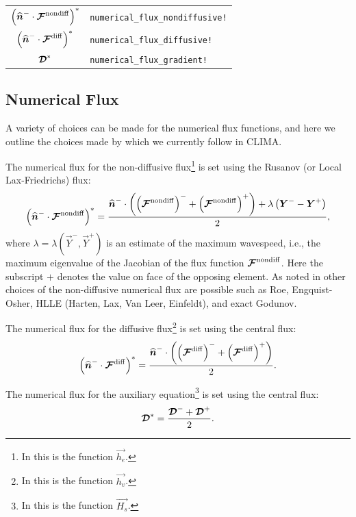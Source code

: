 \documentclass{report}
\begin{document}
{\begin{table}[h]
  \centering
  \begin{tabular}{cl}
    ${\left(\widehat{\boldsymbol{{n}}}^{-} \cdot \boldsymbol{{\mathcal{F}}}^{\mathrm{nondiff}}\right)}^{*}$ & \texttt{numerical\_flux\_nondiffusive!}\\
    ${\left(\widehat{\boldsymbol{{n}}}^{-} \cdot \boldsymbol{{\mathcal{F}}}^{\mathrm{diff}}\right)}^{*}$    & \texttt{numerical\_flux\_diffusive!}\\
    $\boldsymbol{{\mathcal{D}}}^{*}$                               & \texttt{numerical\_flux\_gradient!}\\
  \end{tabular}
\end{table}

\subsection{Numerical Flux}
A variety of choices can be made for the numerical flux functions, and here we
outline the choices made by \citet{bassi:1997nse} which we currently follow
in CLIMA\@.

The numerical flux for the non-diffusive flux\footnote{In \citet[Eq.
(10)]{bassi:1997nse} this is the function $\vec{h_{e}}$.} is set using the
Rusanov (or Local Lax-Friedrichs) flux:
\begin{align}
  {\left(
  \widehat{\boldsymbol{{n}}}^{-} \cdot \boldsymbol{{\mathcal{F}}}^{\mathrm{nondiff}}\right)}^{*} =
  \frac{\widehat{\boldsymbol{{n}}}^{-} \cdot \left(
  {\left(\boldsymbol{{\mathcal{F}}}^{\mathrm{nondiff}}\right)}^{-} +
  {\left(\boldsymbol{{\mathcal{F}}}^{\mathrm{nondiff}}\right)}^{+}\right)
  +
  \lambda
  \left(
  \boldsymbol{{Y}}^{-}
  -
  \boldsymbol{{Y}}^{+}
  \right)}{2},
\end{align}
where $\lambda = \lambda(\vec{Y}^{-}, \vec{Y}^{+})$ is an estimate of the
maximum wavespeed, i.e., the maximum eigenvalue of the Jacobian of the flux
function $\boldsymbol{{\mathcal{F}}}^{\mathrm{nondiff}}$. Here the subscript $+$ denotes the value on face of the
opposing element. As noted in \citet{bassi:1997nse} other choices of the
non-diffusive numerical flux are possible such as Roe, Engquist-Osher, HLLE
(Harten, Lax, Van Leer, Einfeldt), and exact Godunov.

The numerical flux for the diffusive flux\footnote{In \citet[Eq.
(15)]{bassi:1997nse} this is the function $\vec{h_{v}}$.} is set using the
central flux:
\begin{align}
  {\left(
  \widehat{\boldsymbol{{n}}}^{-} \cdot \boldsymbol{{\mathcal{F}}}^{\mathrm{diff}}\right)}^{*} =
  \frac{\widehat{\boldsymbol{{n}}}^{-} \cdot \left(
  {\left(\boldsymbol{{\mathcal{F}}}^{\mathrm{diff}}\right)}^{-} + {\left(\boldsymbol{{\mathcal{F}}}^{\mathrm{diff}}\right)}^{+}
  \right)}{2}.
\end{align}

The numerical flux for the auxiliary equation\footnote{In \citet[Eq.
(13)]{bassi:1997nse} this is the function $\vec{H_{s}}$.} is set using the
central flux:
\begin{align}
  \boldsymbol{{\mathcal{D}}}^{*} = \frac{ \boldsymbol{{\mathcal{D}}}^{-} + \boldsymbol{{\mathcal{D}}}^{+} }{2}.
\end{align}

}
\end{document}
